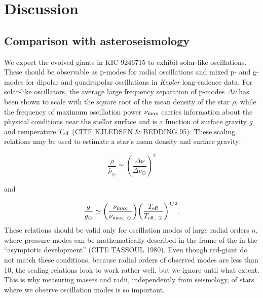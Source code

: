 \section{Discussion}\label{discuss}

\subsection{Comparison with asteroseismology}\label{seismo}

We expect the evolved giants in KIC 9246715 to exhibit solar-like oscillations. These should be observable as p-modes for radial oscillations and mixed p- and g- modes for dipolar and quadrupolar oscillations in \emph{Kepler} long-cadence data. For solar-like oscillators, the average large frequency separation of p-modes $\Delta \nu$ has been shown to scale with the square root of the mean density of the star $\bar{\rho}$, while the frequency of maximum oscillation power $\nu_{\rm{max}}$ carries information about the physical conditions near the stellar surface and is a function of surface gravity $g$ and temperature $T_{\rm{eff}}$ (CITE KJLEDSEN \& BEDDING 95). These scaling relations may be used to estimate a star's mean density and surface gravity:

\begin{equation} \label{density}
{\frac{\bar{\rho}}{\bar{\rho}_{\odot}}} \simeq {\left( \frac{\Delta \nu}{\Delta \nu_{\odot}} \right)}^{2}
\end{equation}

and

\begin{equation} \label{gravity}
{\frac{g}{g_{\odot}}} \simeq {\left( \frac{\nu_{\rm{max}}}{\nu_{\rm{max}, \ \odot}} \right)} {\left( \frac{T_{\rm{eff}}}{T_{\rm{eff}, \ \odot}} \right)}^{1/2}.
\end{equation}
These relations should be valid only for oscillation modes of large radial orders $n$, where pressure modes can be mathematically described in the frame of the  in the ``asymptotic development'' (CITE TASSOUL 1980). Even though red-giant do not match these conditions, because radial orders of observed modes are less than 10, the scaling relations look to work rather well, but we ignore until what extent. This is why measuring masses and radii, independently from seismology, of stars where we observe oscillation modes is so important.

